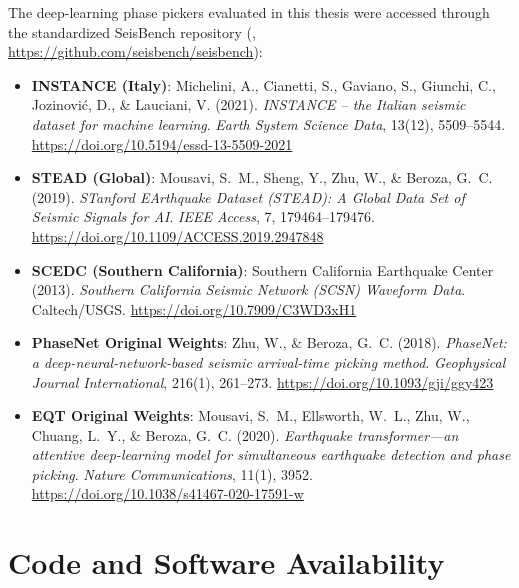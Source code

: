 The deep-learning phase pickers evaluated in this thesis were
accessed through the standardized SeisBench repository
(\cite{SeisBench}, \url{https://github.com/seisbench/seisbench}):
\begin{itemize}
  \item \textbf{\ac{INSTANCE} (Italy)}: Michelini, A., Cianetti, S.,
    Gaviano, S., Giunchi, C., Jozinovi\'c, D., \& Lauciani, V.
    (2021). \textit{INSTANCE -- the Italian seismic dataset for
    machine learning}. \textit{Earth System Science Data}, 13(12),
    5509--5544. \url{https://doi.org/10.5194/essd-13-5509-2021}
  \item \textbf{\ac{STEAD} (Global)}: Mousavi, S.~M., Sheng, Y., Zhu, W.,
    \& Beroza, G.~C. (2019). \textit{STanford EArthquake Dataset
    (STEAD): A Global Data Set of Seismic Signals for AI}.
    \textit{IEEE Access}, 7, 179464--179476.
    \url{https://doi.org/10.1109/ACCESS.2019.2947848}
  \item \textbf{\ac{SCEDC} (Southern California)}: Southern California
    Earthquake Center (2013). \textit{Southern California Seismic
    Network (SCSN) Waveform Data}. Caltech/USGS.
    \url{https://doi.org/10.7909/C3WD3xH1}
  \item \textbf{\ac{PhaseNet} Original Weights}: Zhu, W., \& Beroza,
    G.~C. (2018). \textit{PhaseNet: a deep-neural-network-based
    seismic arrival-time picking method}. \textit{Geophysical
    Journal International}, 216(1), 261--273.
    \url{https://doi.org/10.1093/gji/ggy423}
  \item \textbf{\ac{EQT} Original Weights}: Mousavi,
    S.~M., Ellsworth, W.~L., Zhu, W., Chuang, L.~Y., \& Beroza,
    G.~C. (2020). \textit{Earthquake transformer---an attentive
      deep-learning model for simultaneous earthquake detection and
    phase picking}. \textit{Nature Communications}, 11(1), 3952.
    \url{https://doi.org/10.1038/s41467-020-17591-w}
\end{itemize}

\section*{Code and Software Availability}

